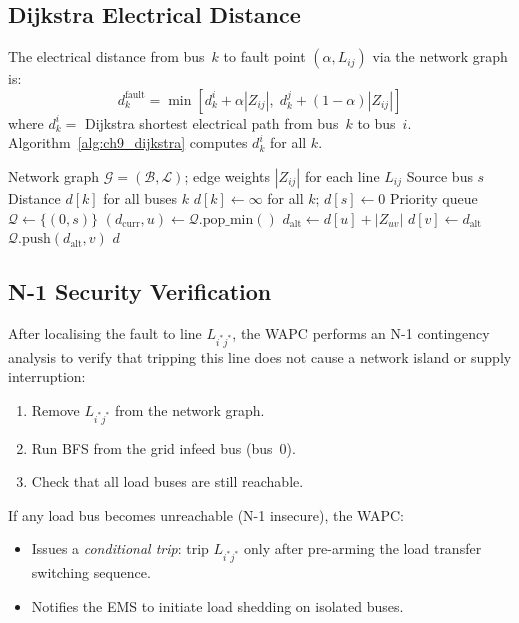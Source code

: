 \subsection{Dijkstra Electrical Distance}

The electrical distance from bus~$k$ to fault point $(\alpha, L_{ij})$
via the network graph is:
\begin{equation}
  d_k^\mathrm{fault} = \min\!\left[d_k^i + \alpha|Z_{ij}|,\;
    d_k^j + (1-\alpha)|Z_{ij}|\right]
  \label{eq:ch9_dijkstra}
\end{equation}
where $d_k^i = $ Dijkstra shortest electrical path from bus~$k$ to bus~$i$.
Algorithm~\ref{alg:ch9_dijkstra} computes $d_k^i$ for all $k$.

\begin{algorithm}[htbp]
\caption{Dijkstra Electrical Distance from Source Bus $s$}
\label{alg:ch9_dijkstra}
\begin{algorithmic}[1]
\Require Network graph $\mathcal{G} = (\mathcal{B}, \mathcal{L})$;
         edge weights $|Z_{ij}|$ for each line $L_{ij}$
\Require Source bus $s$
\Ensure Distance $d[k]$ for all buses $k$
\State $d[k] \leftarrow \infty$ for all $k$; $d[s] \leftarrow 0$
\State Priority queue $\mathcal{Q} \leftarrow \{(0, s)\}$
  \State $(d_\mathrm{curr}, u) \leftarrow \mathcal{Q}.\mathrm{pop\_min}()$
    \State $d_\mathrm{alt} \leftarrow d[u] + |Z_{uv}|$
      \State $d[v] \leftarrow d_\mathrm{alt}$
      \State $\mathcal{Q}.\mathrm{push}(d_\mathrm{alt}, v)$
    \EndIf
  \EndFor
\EndWhile
\State \Return $d$
\end{algorithmic}
\end{algorithm}

\subsection{N-1 Security Verification}

After localising the fault to line $L_{i^\ast j^\ast}$, the WAPC performs
an N-1 contingency analysis to verify that tripping this line does not
cause a network island or supply interruption:
\begin{enumerate}
\item Remove $L_{i^\ast j^\ast}$ from the network graph.
\item Run BFS from the grid infeed bus (bus~0).
\item Check that all load buses are still reachable.
\end{enumerate}
If any load bus becomes unreachable (N-1 insecure), the WAPC:
\begin{itemize}
\item Issues a \emph{conditional trip}: trip $L_{i^\ast j^\ast}$ only
      after pre-arming the load transfer switching sequence.
\item Notifies the EMS to initiate load shedding on isolated buses.
\end{itemize}

